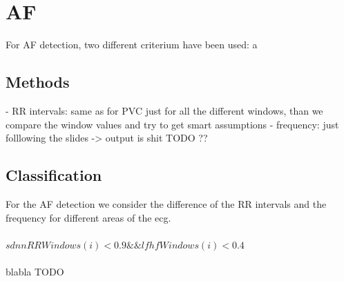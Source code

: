 \documentclass[a4paper,titlepage]{article}
\begin{document}
\begin{figure}[h!]

\hspace*{-\dimexpr\oddsidemargin+1in\relax}\hspace*{-\paperwidth}
\end{figure}

\clearpage


\section{AF}
For AF detection, two different criterium have been used: a 
\subsection{Methods}
- RR intervals: same as for PVC just for all the different windows, than we compare the window values and try to get smart assumptions
- frequency: just folllowing the slides -> output is shit TODO ??


\subsection{Classification}
For the AF detection we consider the difference of the RR intervals and the frequency for different areas of the ecg.\\\\
$sdnnRRWindows(i) < 0.9 \&\& lfhfWindows(i) < 0.4$
\\\\
blabla TODO
\end{document}

